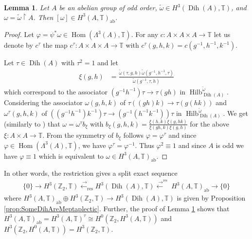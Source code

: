 \documentclass[twoside,11pt,reqno]{amsart}
\newtheorem{lem}[thm]{Lemma}
\theoremstyle{definition}
\theoremstyle{remark}
\newcommand{\TT}{\mathbb{T}}
\newcommand{\ZZ}{\mathbb{Z}}
\DeclareMathOperator{\Hom}{Hom}
\DeclareMathOperator{\Dih}{Dih}
\DeclareMathOperator{\Vect}{Hilb}
\begin{document}
\begin{lem} 
  \label{lem:H3ab}
  Let $A$ be an abelian group of odd order, $\tilde\omega\in H^3(\Dih(A),\TT)$, 
  and $\omega =\tilde\omega\restriction A$. 
  Then $[\omega]\in H^3(A,\TT)_\mathrm{ab}$.
\end{lem}
\begin{proof}
  Let $\varphi=\psi^\ast\omega\in \Hom(\Lambda^3(A),\TT)$. 
  For any $c\colon A\times A \times A \to \TT$ let us denote by $c^\tau$ the map
  $c^\tau\colon A\times A \times A \to \TT$ with 
  $c^\tau(g,h,k)=c(g^{-1},h^{-1},k^{-1})$.

  Let $\tau\in\Dih(A)$ with $\tau^2=1$ and let 
  \begin{align}
    \xi(g,h)&=\frac{\tilde\omega(\tau,g,h)\tilde\omega(g^{-1},h^{-1},\tau)}
    {\tilde\omega(g^{-1},\tau,h)}
  \end{align}
  which correspond to the associator $(g^{-1}h^{-1})\tau\to \tau(gh)$ in 
  $\Vect_{\Dih(A)}^{\tilde\omega}$.
  Considering the associator $\omega(g,h,k)$ of 
  $\tau((gh)k)\to \tau( g(hk))$ and $\omega^\tau(g,h,k)$ of
  $((g^{-1}h^{-1})k^{-1})\tau\to(g^{-1}(h^{-1}k^{-1}))\tau$ 
  in $\Vect_{\Dih(A)}^{\tilde \omega}$.
  We get 
  (similarly to \cite[Lemma 2.5]{Iz2016}) that $\omega =\omega^\tau  b_\xi$ with
  $b_\xi(g,h,k) =\frac{\xi(h,k)\xi(g,hk)}{\xi(gh,k)\xi(g,h)}$ for the above 
  $\xi\colon A\times A \to \TT$. 
  From the symmetry of $b_\xi$ follows $\varphi =\varphi^\tau$ and since 
  $\varphi \in \Hom(\Lambda^3(A),\TT)$, we have $\varphi^\tau=\varphi^{-1}$. 
  Thus $\varphi^2\equiv 1$ and since $A$ is odd we have $\varphi\equiv 1$ which 
  is equivalent to $\omega \in H^3(A,\TT)_\mathrm{ab}$.
\end{proof}
In other words, the restriction gives a split exact sequence 
\begin{align}
  \{0\} \longrightarrow H^3(\ZZ_2,\TT) %
  \stackrel{\displaystyle\mathop{\longrightarrow}^{\phantom{\mathrm{res}}}}{\displaystyle\mathop{\longleftarrow}_{\mathrm{res}}}
  H^3(\Dih(A),\TT) 
  \stackrel{\displaystyle\mathop{\longrightarrow}^{{\mathrm{res}}}}{\displaystyle\mathop{\longleftarrow}_{\phantom{\mathrm{res}}}}
   H^3(A,\TT)_\mathrm{ab} \longrightarrow
  \{0\}
\end{align}
where $H^3(A,\TT)_\mathrm{ab}\oplus H^3(\ZZ_2,\TT)\to H^3(\Dih(A),\TT)$ is given by Proposition \ref{prop:SomeDihAreMeptaplectic}.
Further, the proof of Lemma \ref{lem:H3ab} shows that 
$H^3(A,\TT)_\mathrm{ab}=H^3(A,\TT)^\tau\cong H^0(\ZZ_2,H^3(A,\TT))$ and 
$H^3(\ZZ_2,H^0(A,\TT))=H^3(\ZZ_2,\TT)$. 
%
\end{document}
